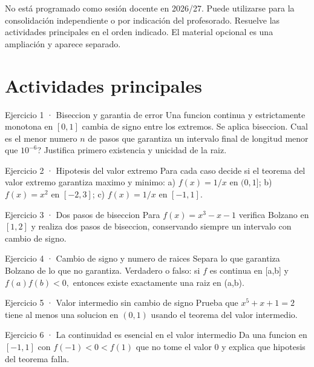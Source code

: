 \documentclass[10pt,a4paper,oneside,openany]{book}
\begin{document}
No está programado como sesión docente en 2026/27. Puede utilizarse para la consolidación independiente o por indicación del profesorado.
Resuelve las actividades principales en el orden indicado. El material opcional es una ampliación y aparece separado.
\section*{Actividades principales}
\begin{PSevenExerciseFixed}{Ejercicio 1 · Biseccion y garantia de error}
Una funcion continua y estrictamente monotona en \([0,1]\) cambia de signo entre los extremos. Se aplica biseccion. Cual es el menor numero \(n\) de pasos que garantiza un intervalo final de longitud menor que \(10^{-6}\)? Justifica primero existencia y unicidad de la raiz.
\end{PSevenExerciseFixed}
\begin{PSevenExerciseFixed}{Ejercicio 2 · Hipotesis del valor extremo}
Para cada caso decide si el teorema del valor extremo garantiza maximo y minimo: a) \(f(x)=1/x\) en \((0,1]\); b) \(f(x)=x^{2}\) en \([-2,3]\); c) \(f(x)=1/x\) en \([-1,1]\).
\end{PSevenExerciseFixed}
\begin{PSevenExerciseFixed}{Ejercicio 3 · Dos pasos de biseccion}
Para \(f(x)=x^{3}-x-1\) verifica Bolzano en \([1,2]\) y realiza dos pasos de biseccion, conservando siempre un intervalo con cambio de signo.
\end{PSevenExerciseFixed}
\begin{PSevenExerciseFixed}{Ejercicio 4 · Cambio de signo y numero de raices}
Separa lo que garantiza Bolzano de lo que no garantiza. Verdadero o falso: si \(f\) es continua en [a,b] y \(f(a)f(b)<0,\) entonces existe exactamente una raiz en (a,b).
\end{PSevenExerciseFixed}
\begin{PSevenExerciseFixed}{Ejercicio 5 · Valor intermedio sin cambio de signo}
Prueba que \(x^{5}+x+1=2\) tiene al menos una solucion en \((0,1)\) usando el teorema del valor intermedio.
\end{PSevenExerciseFixed}
\begin{PSevenExerciseFixed}{Ejercicio 6 · La continuidad es esencial en el valor intermedio}
Da una funcion en \([-1,1]\) con \(f(-1)<0<f(1)\) que no tome el valor \(0\) y explica que hipotesis del teorema falla.
\end{PSevenExerciseFixed}
\end{document}
